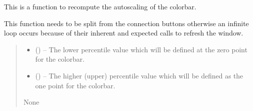 \documentclass[letterpaper,11pt,english]{sphinxmanual}
\begin{document}
\begin{savenotes}
\begin{fulllineitems}
\begin{savenotes}\begin{fulllineitems}
\label{\detokenize{code/opihiexarata.gui.selector:opihiexarata.gui.selector.TargetSelectorWindow._recompute_colorbar_autoscale}}
\pysigstartsignatures
{}
\pysigstopsignatures
\sphinxAtStartPar
This is a function to recompute the autoscaling of the colorbar.

\sphinxAtStartPar
This function needs to be split from the connection buttons otherwise
an infinite loop occurs because of their inherent and expected calls
to refresh the window.
\begin{quote}\begin{description}
\begin{itemize}
\item {} 
\sphinxAtStartPar
{} (\sphinxstyleliteralemphasis{\sphinxupquote{, }}) – The lower percentile value which will be defined at the zero point
for the colorbar.

\item {} 
\sphinxAtStartPar
{} (\sphinxstyleliteralemphasis{\sphinxupquote{, }}) – The higher (upper) percentile value which will be defined as the
one point for the colorbar.

\end{itemize}

\sphinxAtStartPar
None

\end{description}\end{quote}

\end{fulllineitems}\end{savenotes}



\end{fulllineitems}
\end{savenotes}
\end{document}
